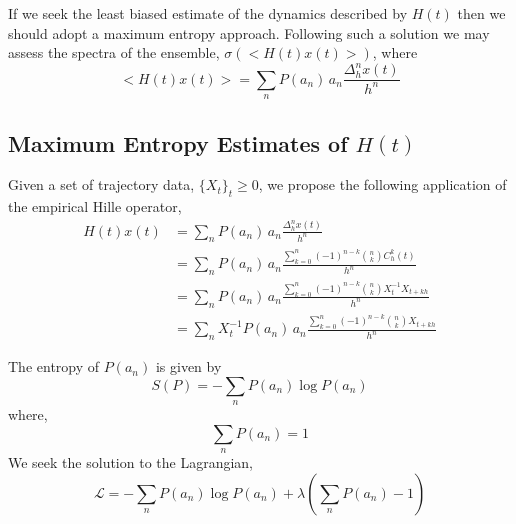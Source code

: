 \documentclass{article}
\newcommand{\Lgr}{\mathcal{L}}
\begin{document}
If we seek the least biased estimate of the dynamics described by $H(t)$ then we should adopt a maximum entropy approach. Following such a solution we may assess the spectra of the ensemble, $\sigma(<H(t)x(t)>)$, where
$$
    <H(t) x(t) > = \sum_n P(a_n)\, a_n \frac{\Delta^n_h x(t)}{h^n}
$$

\subsection{Maximum Entropy Estimates of $H(t)$}
Given a set of trajectory data, $\{X_t\}_t\geq0$, we propose the following application of the empirical Hille operator,
\begin{align*}
    H(t)x(t) &= \sum_n P(a_n) \, a_n \frac{\Delta^n_h x(t)}{h^n}\\
    &= \sum_{n} P(a_n) \, a_n \frac{ \sum_{k=0}^n (-1)^{n-k} {n \choose k} C_h^k(t)}{h^n}\\
    &= \sum_{n} P(a_n) \, a_n \frac{ \sum_{k=0}^n (-1)^{n-k} {n \choose k} X_t^{-1} X_{t+kh}}{h^n}\\
    &= \sum_{n} X_t^{-1} P(a_n) \, a_n  \frac{ \sum_{k=0}^n (-1)^{n-k} {n \choose k} X_{t+kh}}{h^n}
\end{align*}

The entropy of $P(a_n)$ is given by
$$
    S(P) = - \sum_n P(a_n) \log P(a_n)
$$
where,
$$
    \sum_n P(a_n) = 1
$$
We seek the solution to the Lagrangian,
$$
     \Lgr = -\sum_n P(a_n) \log P(a_n) + \lambda \left( \sum_n P(a_n) -1\right)
$$
\end{document}
